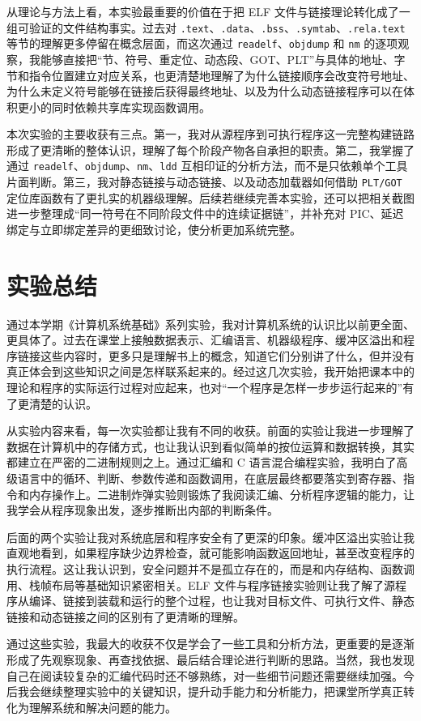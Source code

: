 \documentclass[supercite]{Experimental_Report}
\theoremstyle{definition}
\begin{document}
从理论与方法上看，本实验最重要的价值在于把 ELF 文件与链接理论转化成了一组可验证的文件结构事实。过去对 \texttt{.text}、\texttt{.data}、\texttt{.bss}、\texttt{.symtab}、\texttt{.rela.text} 等节的理解更多停留在概念层面，而这次通过 \texttt{readelf}、\texttt{objdump} 和 \texttt{nm} 的逐项观察，我能够直接把“节、符号、重定位、动态段、GOT、PLT”与具体的地址、字节和指令位置建立对应关系，也更清楚地理解了为什么链接顺序会改变符号地址、为什么未定义符号能够在链接后获得最终地址、以及为什么动态链接程序可以在体积更小的同时依赖共享库实现函数调用。

本次实验的主要收获有三点。第一，我对从源程序到可执行程序这一完整构建链路形成了更清晰的整体认识，理解了每个阶段产物各自承担的职责。第二，我掌握了通过 \texttt{readelf}、\texttt{objdump}、\texttt{nm}、\texttt{ldd} 互相印证的分析方法，而不是只依赖单个工具片面判断。第三，我对静态链接与动态链接、以及动态加载器如何借助 \texttt{PLT/GOT} 定位库函数有了更扎实的机器级理解。后续若继续完善本实验，还可以把相关截图进一步整理成“同一符号在不同阶段文件中的连续证据链”，并补充对 PIC、延迟绑定与立即绑定差异的更细致讨论，使分析更加系统完整。

\section{实验总结}
通过本学期《计算机系统基础》系列实验，我对计算机系统的认识比以前更全面、更具体了。过去在课堂上接触数据表示、汇编语言、机器级程序、缓冲区溢出和程序链接这些内容时，更多只是理解书上的概念，知道它们分别讲了什么，但并没有真正体会到这些知识之间是怎样联系起来的。经过这几次实验，我开始把课本中的理论和程序的实际运行过程对应起来，也对“一个程序是怎样一步步运行起来的”有了更清楚的认识。

从实验内容来看，每一次实验都让我有不同的收获。前面的实验让我进一步理解了数据在计算机中的存储方式，也让我认识到看似简单的按位运算和数据转换，其实都建立在严密的二进制规则之上。通过汇编和 C 语言混合编程实验，我明白了高级语言中的循环、判断、参数传递和函数调用，在底层最终都要落实到寄存器、指令和内存操作上。二进制炸弹实验则锻炼了我阅读汇编、分析程序逻辑的能力，让我学会从程序现象出发，逐步推断出内部的判断条件。

后面的两个实验让我对系统底层和程序安全有了更深的印象。缓冲区溢出实验让我直观地看到，如果程序缺少边界检查，就可能影响函数返回地址，甚至改变程序的执行流程。这让我认识到，安全问题并不是孤立存在的，而是和内存结构、函数调用、栈帧布局等基础知识紧密相关。ELF 文件与程序链接实验则让我了解了源程序从编译、链接到装载和运行的整个过程，也让我对目标文件、可执行文件、静态链接和动态链接之间的区别有了更清晰的理解。

通过这些实验，我最大的收获不仅是学会了一些工具和分析方法，更重要的是逐渐形成了先观察现象、再查找依据、最后结合理论进行判断的思路。当然，我也发现自己在阅读较复杂的汇编代码时还不够熟练，对一些细节问题还需要继续加强。今后我会继续整理实验中的关键知识，提升动手能力和分析能力，把课堂所学真正转化为理解系统和解决问题的能力。


\end{document}
